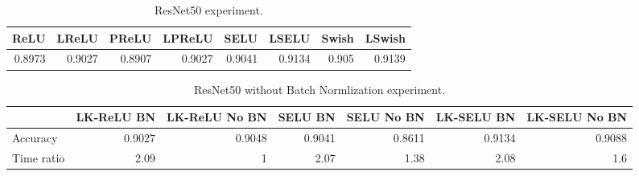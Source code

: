 \documentclass[10pt,twocolumn,letterpaper]{article}
\begin{document}
\begin{table*}[h]
    \centering
    
    \begin{tabular}{rrrrrrrr}
\toprule
   ReLU &   LReLU &   PReLU &  LPReLU &    SELU &   LSELU &  Swish &  LSwish \\
\midrule
 0.8973 &  0.9027 &  0.8907 &  0.9027 &  0.9041 &  0.9134 &  0.905 &  0.9139 \\
\bottomrule
\end{tabular}
    
    \caption{ResNet50 experiment.}
    \label{tab:resnet50}
\end{table*}

\begin{table*}[!ht]
    \centering
    
    \begin{tabular}{lrrrrrr}
\toprule{} &  LK-ReLU BN &  LK-ReLU No BN &   SELU BN &  SELU No BN &  LK-SELU BN &  LK-SELU No BN \\
\midrule
Accuracy & 0.9027 &0.9048 &0.9041 &0.8611 & 0.9134 &0.9088 \\
Time ratio &    2.09 &         1 &  2.07 &    1.38 &    2.08 &       1.6 \\
\bottomrule
\end{tabular}
    
    \caption{ResNet50 without Batch Normlization experiment.}
    \label{tab:resnet50_nobatchnorm}
\end{table*}
\end{document}
